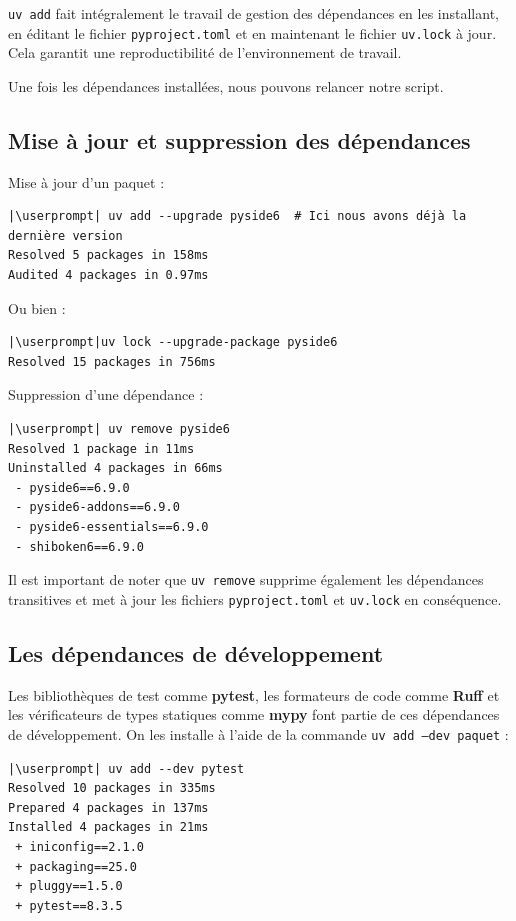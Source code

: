 \texttt{uv add} fait intégralement le travail de gestion des dépendances en les installant, en éditant le fichier \texttt{pyproject.toml} et en maintenant le fichier \texttt{uv.lock} à jour. Cela garantit une reproductibilité de l'environnement de travail.

Une fois les dépendances installées, nous pouvons relancer notre script.

\subsection*{Mise à jour et suppression des dépendances}
Mise à jour d'un paquet :
\begin{lstlisting}[style=bash]
|\userprompt| uv add --upgrade pyside6  # Ici nous avons déjà la dernière version
Resolved 5 packages in 158ms
Audited 4 packages in 0.97ms
\end{lstlisting}

Ou bien :
\begin{lstlisting}[style=bash]
|\userprompt|uv lock --upgrade-package pyside6
Resolved 15 packages in 756ms
\end{lstlisting}

Suppression d'une dépendance :
\begin{lstlisting}[style=bash]
|\userprompt| uv remove pyside6
Resolved 1 package in 11ms
Uninstalled 4 packages in 66ms
 - pyside6==6.9.0
 - pyside6-addons==6.9.0
 - pyside6-essentials==6.9.0
 - shiboken6==6.9.0
\end{lstlisting}

Il est important de noter que \texttt{uv remove} supprime également les dépendances transitives et met à jour les fichiers \texttt{pyproject.toml} et \texttt{uv.lock} en conséquence.

\subsection*{Les dépendances de développement}
Les bibliothèques de test comme \textbf{pytest}, les formateurs de code comme \textbf{Ruff} et les vérificateurs de types statiques comme \textbf{mypy} font partie de ces dépendances de développement. On les installe à l'aide de la commande \texttt{uv add --dev paquet} :
\begin{lstlisting}[style=bash]
|\userprompt| uv add --dev pytest
Resolved 10 packages in 335ms
Prepared 4 packages in 137ms
Installed 4 packages in 21ms
 + iniconfig==2.1.0
 + packaging==25.0
 + pluggy==1.5.0
 + pytest==8.3.5
\end{lstlisting}

